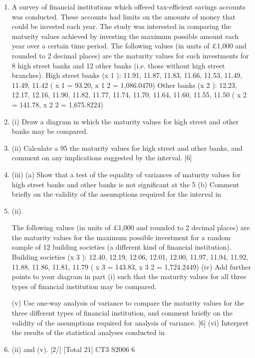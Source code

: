 \documentclass[a4paper,12pt]{article}
\begin{document}
\begin{enumerate}
\item 
A survey of financial institutions which offered tax-efficient savings accounts was
conducted. These accounts had limits on the amounts of money that could be
invested each year. The study was interested in comparing the maturity values
achieved by investing the maximum possible amount each year over a certain time
period.
The following values (in units of £1,000 and rounded to 2 decimal places) are the
maturity values for such investments for 8 high street banks and 12 other banks (i.e.
those without high street branches).
High street banks (x 1 ): 11.91, 11.87, 11.83, 11.66, 11.53, 11.49, 11.49, 11.42
( x 1 = 93.20, x 1 2 = 1,086.0470)
Other banks (x 2 ): 12.23, 12.17, 12.16, 11.90, 11.82, 11.77, 11.74, 11.70, 11.64, 11.60,
11.55, 11.50
( x 2 = 141.78, x 2 2 = 1,675.8224)
\item (i) Draw a diagram in which the maturity values for high street and other banks
may be compared.

\item (ii) Calculate a 95%
the maturity values for high street and other banks, and comment on any
implications suggested by the interval.
[6]
\item (iii) (a)
Show that a test of the equality of variances of maturity values for high
street banks and other banks is not significant at the 5%
(b)
Comment briefly on the validity of the assumptions required for the
interval in \item (ii).

The following values (in units of £1,000 and rounded to 2 decimal places) are the
maturity values for the maximum possible investment for a random sample of 12
building societies (a different kind of financial institution).
Building societies (x 3 ): 12.40, 12.19, 12.06, 12.01, 12.00, 11.97, 11.94, 11.92, 11.88,
11.86, 11.81, 11.79
( x 3 = 143.83, x 3 2 = 1,724.2449)
(iv) Add further points to your diagram in part (i) such that the maturity values for
all three types of financial institution may be compared.

(v) Use one-way analysis of variance to compare the maturity values for the three
different types of financial institution, and comment briefly on the validity of
the assumptions required for analysis of variance.
[6]
(vi) Interpret the results of the statistical analyses conducted in \item (ii) and (v).
[2/]
[Total 21]
CT3 S2006
6


\end{enumerate}
\end{document}
